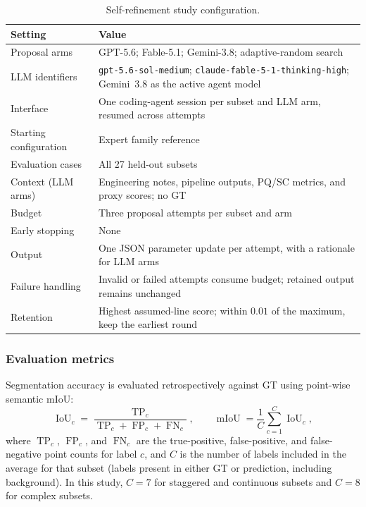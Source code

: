 \documentclass[a4paper,fleqn]{cas-dc}
\begin{document}
\begin{table}[ht]
\caption{Self-refinement study configuration.}
\label{tab:poc-config}
\centering
\begin{tabular}{p{} p{}}
\toprule
Setting & Value \\
\midrule
Proposal arms & GPT-5.6; Fable-5.1; Gemini-3.8; adaptive-random search \\
LLM identifiers & \texttt{gpt-5.6-sol-medium}; \texttt{claude-fable-5-1-thinking-high}; Gemini~3.8 as the active agent model \\
Interface & One coding-agent session per subset and LLM arm, resumed across attempts \\
Starting configuration & Expert family reference \\
Evaluation cases & All 27 held-out subsets \\
Context (LLM arms) & Engineering notes, pipeline outputs, PQ/SC metrics, and proxy scores; no GT \\
Budget & Three proposal attempts per subset and arm \\
Early stopping & None \\
Output & One JSON parameter update per attempt, with a rationale for LLM arms \\
Failure handling & Invalid or failed attempts consume budget; retained output remains unchanged \\
\rowcolor{yellow!25}Retention & Highest assumed-line score; within $0.01$ of the maximum, keep the earliest round \\
\bottomrule
\end{tabular}
\end{table}


\subsubsection{Evaluation metrics}
\label{sec:metrics}

Segmentation accuracy is evaluated retrospectively against GT using point-wise semantic mIoU:
\begin{equation}
\operatorname{IoU}_c
=
\frac{\operatorname{TP}_c}
{\operatorname{TP}_c+\operatorname{FP}_c+\operatorname{FN}_c},
\qquad
\operatorname{mIoU}
=
\frac{1}{C}\sum_{c=1}^{C}\operatorname{IoU}_c,
\end{equation}
where $\operatorname{TP}_c$, $\operatorname{FP}_c$, and $\operatorname{FN}_c$ are the true-positive, false-positive, and false-negative point counts for label $c$, and $C$ is the number of labels included in the average for that subset (labels present in either GT or prediction, including background). In this study, $C=7$ for staggered and continuous subsets and $C=8$ for complex subsets.
\end{document}
